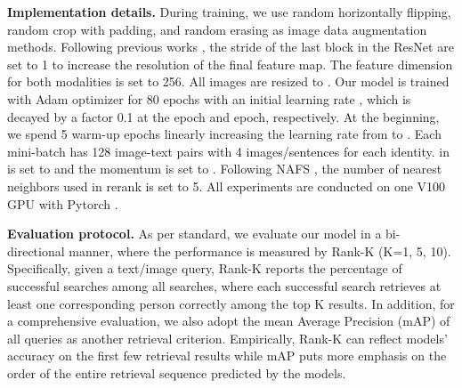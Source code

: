 \documentclass{bmvc2k}
\newcommand{\revision}[1]{#1}
\newcommand{\statement}[1]{\noindent\textbf{#1}}
\begin{document}
\statement{Implementation details.} During training, we use random horizontally flipping, random crop with padding, and random erasing \cite{luo2019strong} as image data augmentation methods. 
Following previous works \cite{gao2021contextual,zheng2020hierarchical,wang2020vitaa}, the stride of the last block in the ResNet are set to 1 to increase the resolution of the final feature map. 
The feature dimension  for both modalities is set to 256.  
All images are resized to . 
Our model is trained with Adam optimizer \cite{kingma2014adam} for 80 epochs with an initial learning rate , which is decayed by a factor 0.1 at the  epoch and  epoch, respectively. 
At the beginning, we spend 5 warm-up epochs linearly increasing the learning rate from  to . 
Each mini-batch has 128 image-text pairs with 4 images/sentences for each identity. 
 in  is set to  and the momentum  is set to . 
Following NAFS \cite{gao2021contextual}, the number of nearest neighbors  used in rerank is set to 5.
All experiments are conducted on one V100 GPU with Pytorch \cite{paszke2019pytorch}. 

\statement{Evaluation protocol.} As per standard, we evaluate our model in a bi-directional manner, where the performance is measured by Rank-K (K=1, 5, 10). \revision{Specifically, given a text/image query, Rank-K reports the percentage of successful searches among all searches, where each successful search retrieves at least one corresponding person correctly among the top K results.}
In addition, for a comprehensive evaluation, we also adopt the mean Average Precision (mAP) of all queries \cite{zheng2020hierarchical,farooq2021axm,wang2021mgel} as another retrieval criterion. \revision{Empirically, Rank-K can reflect models' accuracy on the first few retrieval results while mAP puts more emphasis on the order of the entire retrieval sequence predicted by the models.}

\vspace*{-3mm}
\end{document}
